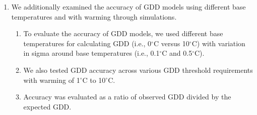 \documentclass{article}\usepackage[]{graphicx}\usepackage[]{color}
\begin{document}
\begin{enumerate}
\item We additionally examined the accuracy of GDD models using different base temperatures and with warming through simulations.
\begin{enumerate}
  \item To evaluate the accuracy of GDD models, we used different base temperatures for calculating GDD (i.e., 0$^{\circ}$C versus 10$^{\circ}$C) with variation in sigma around base temperatures (i.e., 0.1$^{\circ}$C and 0.5$^{\circ}$C).
  \item We also tested GDD accuracy across various GDD threshold requirements with warming of 1$^{\circ}$C to 10$^{\circ}$C. 
  \item Accuracy was evaluated as a ratio of observed GDD divided by the expected GDD.
\end{enumerate}
\end{enumerate}
\end{document}
